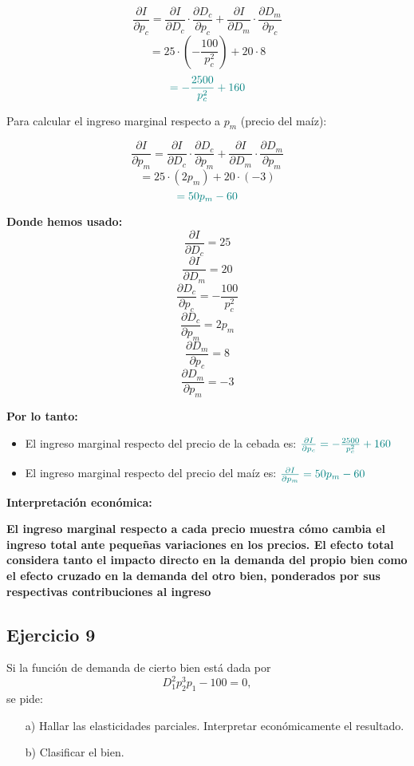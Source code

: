 \documentclass{article}
\begin{document}
\[
\frac{\partial I}{\partial p_c} = \frac{\partial I}{\partial D_c} \cdot \frac{\partial D_c}{\partial p_c} + \frac{\partial I}{\partial D_m} \cdot \frac{\partial D_m}{\partial p_c}
\]
\[
= 25 \cdot \left(-\frac{100}{p_c^2}\right) + 20 \cdot 8
\]
\[
\color{teal}
= -\frac{2500}{p_c^2} + 160
\]

Para calcular el ingreso marginal respecto a \(p_m\) (precio del maíz):

\[
\frac{\partial I}{\partial p_m} = \frac{\partial I}{\partial D_c} \cdot \frac{\partial D_c}{\partial p_m} + \frac{\partial I}{\partial D_m} \cdot \frac{\partial D_m}{\partial p_m}
\]
\[
= 25 \cdot (2p_m) + 20 \cdot (-3)
\]
\[
\color{teal}
= 50p_m - 60
\]

\textbf{Donde hemos usado:}
\[
\frac{\partial I}{\partial D_c} = 25
\]
\[
\frac{\partial I}{\partial D_m} = 20
\]
\[
\frac{\partial D_c}{\partial p_c} = -\frac{100}{p_c^2}
\]
\[
\frac{\partial D_c}{\partial p_m} = 2p_m
\]
\[
\frac{\partial D_m}{\partial p_c} = 8
\]
\[
\frac{\partial D_m}{\partial p_m} = -3
\]

\textbf{Por lo tanto:}
\begin{itemize}
    \item El ingreso marginal respecto del precio de la cebada es: \(\color{teal} \frac{\partial I}{\partial p_c} = -\frac{2500}{p_c^2} + 160\)
    \item El ingreso marginal respecto del precio del maíz es: \(\color{teal} \frac{\partial I}{\partial p_m} = 50p_m - 60\)
\end{itemize}

\textbf{\color{teal}Interpretación económica:}

\textbf{\color{teal}El ingreso marginal respecto a cada precio muestra cómo cambia el ingreso total ante pequeñas variaciones en los precios. El efecto total considera tanto el impacto directo en la demanda del propio bien como el efecto cruzado en la demanda del otro bien, ponderados por sus respectivas contribuciones al ingreso}

\newpage
\subsection{Ejercicio 9}
Si la función de demanda de cierto bien está dada por 
\[
D_1^2 p_2^3 p_1 - 100 = 0,
\]
se pide:
\begin{itemize}
    \item[a)] Hallar las elasticidades parciales. Interpretar económicamente el resultado.
    \item[b)] Clasificar el bien.
\end{itemize}
\end{document}

